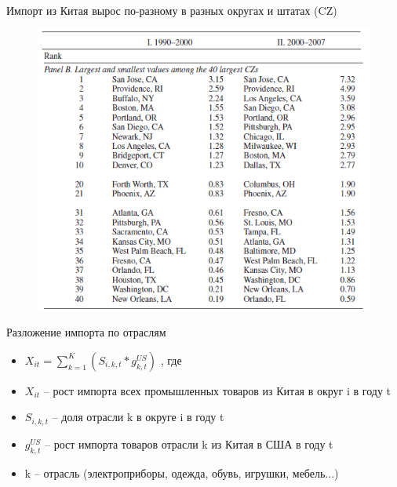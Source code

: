 \begin{frame}{Импорт из Китая вырос по-разному в разных округах и штатах (CZ)}
 \begin{figure}
 \centering
       \includegraphics[width=\textwidth]{Lecture_Sources/Images/Bartik_differences.png}
  \end{figure}
\end{frame}

\begin{frame}{Разложение импорта по отраслям}
    \begin{itemize}
      \item$X_{it}=\sum\limits_{k=1}^K(S_{i,k,t}*g_{k,t}^{US})$ , где
      \item $X_{it}$ -- рост импорта всех промышленных товаров из Китая в округ i в году t
      \item $S_{i,k,t}$ -- доля отрасли k в округе i в году t
      \item $g_{k,t}^{US}$ --  рост импорта товаров отрасли k из Китая в США в году t
      \item k -- отрасль (электроприборы, одежда, обувь, игрушки, мебель...)
  \end{itemize}
\end{frame}


